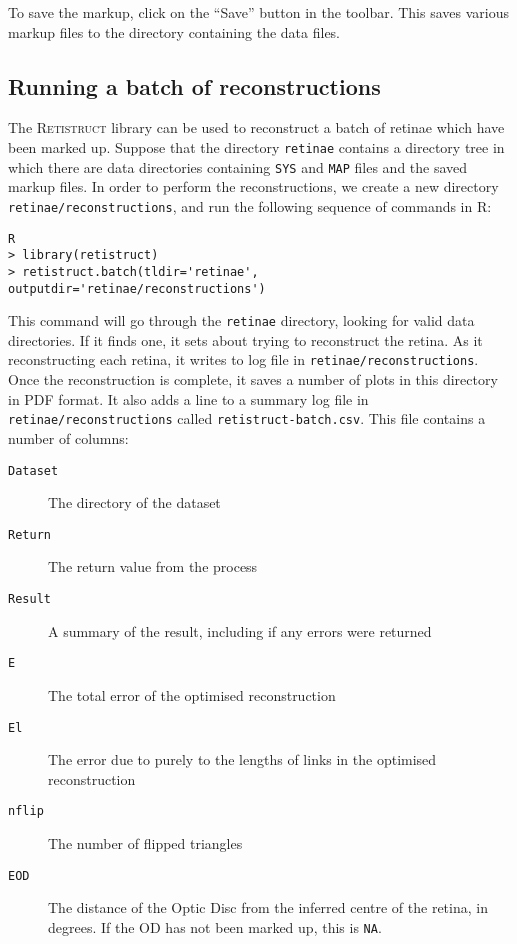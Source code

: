 \documentclass{article}
\begin{document}
To save the markup, click on the ``Save'' button in the toolbar. This
saves various markup files to the directory containing the data files.

\subsection{Running a batch of reconstructions}
\label{manual:sec:runn-batch-reconstr}

The \textsc{Retistruct} library can be used to reconstruct a batch of
retinae which have been marked up. Suppose that the directory
\texttt{retinae} contains a directory tree in which there are data
directories containing \texttt{SYS} and \texttt{MAP} files and the
saved markup files. In order to perform the reconstructions, we create
a new directory \texttt{retinae/reconstructions}, and run the
following sequence of commands in R:
\begin{verbatim}
R
> library(retistruct)
> retistruct.batch(tldir='retinae', outputdir='retinae/reconstructions')
\end{verbatim}
This command will go through the \texttt{retinae} directory, looking
for valid data directories. If it finds one, it sets about trying to
reconstruct the retina. As it reconstructing each retina, it writes to
log file in \texttt{retinae/reconstructions}. Once the reconstruction
is complete, it saves a number of plots in this directory in PDF
format. It also adds a line to a summary log file in
\texttt{retinae/reconstructions} called
\texttt{retistruct-batch.csv}. This file contains a number of columns:
\begin{description}
\item[\texttt{Dataset}] The directory of the dataset
\item[\texttt{Return}] The return value from the process
\item[\texttt{Result}] A summary of the result, including if any
  errors were returned
\item[\texttt{E}] The total error  of the optimised reconstruction
\item[\texttt{El}] The error due to purely to the lengths of links in
  the optimised reconstruction
\item[\texttt{nflip}] The number of flipped triangles
\item[\texttt{EOD}] The distance of the Optic Disc from the inferred
  centre of the retina, in degrees. If the OD has not been marked up,
  this is \texttt{NA}.
\end{description}
\end{document}
